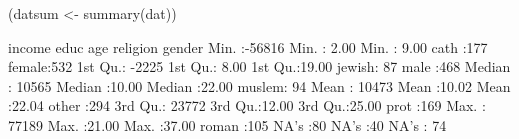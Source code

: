 \begin{Schunk}
\begin{Sinput}
 (datsum <- summary(dat))
\end{Sinput}
\begin{Soutput}
     income            educ            age          religion      gender   
 Min.   :-56816   Min.   : 2.00   Min.   : 9.00   cath  :177   female:532  
 1st Qu.: -2225   1st Qu.: 8.00   1st Qu.:19.00   jewish: 87   male  :468  
 Median : 10565   Median :10.00   Median :22.00   muslem: 94               
 Mean   : 10473   Mean   :10.02   Mean   :22.04   other :294               
 3rd Qu.: 23772   3rd Qu.:12.00   3rd Qu.:25.00   prot  :169               
 Max.   : 77189   Max.   :21.00   Max.   :37.00   roman :105               
 NA's   :80       NA's   :40                      NA's  : 74               
\end{Soutput}
\end{Schunk}
